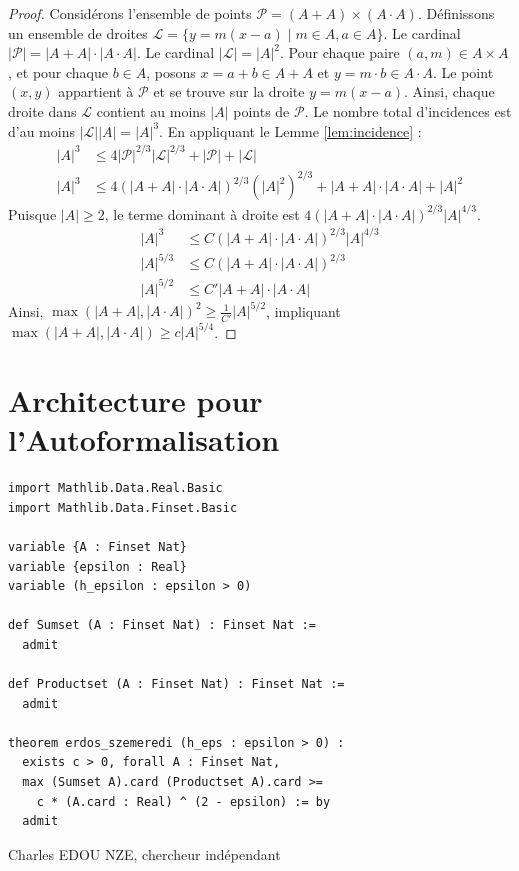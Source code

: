 \documentclass[12pt]{article}
\begin{document}
\begin{proof}
Consid\'erons l'ensemble de points $\mathcal{P} = (A + A) \times (A \cdot A)$.
D\'efinissons un ensemble de droites $\mathcal{L} = \{ y = m(x - a) \mid m \in A, a \in A \}$.
Le cardinal $|\mathcal{P}| = |A + A| \cdot |A \cdot A|$.
Le cardinal $|\mathcal{L}| = |A|^2$.
Pour chaque paire $(a, m) \in A \times A$, et pour chaque $b \in A$, posons $x = a + b \in A + A$ et $y = m \cdot b \in A \cdot A$.
Le point $(x, y)$ appartient \`a $\mathcal{P}$ et se trouve sur la droite $y = m(x - a)$.
Ainsi, chaque droite dans $\mathcal{L}$ contient au moins $|A|$ points de $\mathcal{P}$.
Le nombre total d'incidences est d'au moins $|\mathcal{L}| |A| = |A|^3$.
En appliquant le Lemme \ref{lem:incidence} :
\begin{align*}
|A|^3 &\leq 4 |\mathcal{P}|^{2/3} |\mathcal{L}|^{2/3} + |\mathcal{P}| + |\mathcal{L}| \\
|A|^3 &\leq 4 (|A + A| \cdot |A \cdot A|)^{2/3} (|A|^2)^{2/3} + |A + A| \cdot |A \cdot A| + |A|^2
\end{align*}
Puisque $|A| \geq 2$, le terme dominant \`a droite est $4 (|A + A| \cdot |A \cdot A|)^{2/3} |A|^{4/3}$.
\begin{align*}
|A|^3 &\leq C (|A + A| \cdot |A \cdot A|)^{2/3} |A|^{4/3} \\
|A|^{5/3} &\leq C (|A + A| \cdot |A \cdot A|)^{2/3} \\
|A|^{5/2} &\leq C' |A + A| \cdot |A \cdot A|
\end{align*}
Ainsi, $\max(|A + A|, |A \cdot A|)^2 \geq \frac{1}{C'} |A|^{5/2}$, impliquant $\max(|A + A|, |A \cdot A|) \geq c |A|^{5/4}$.
\end{proof}

\section{Architecture pour l'Autoformalisation}
\begin{lstlisting}
import Mathlib.Data.Real.Basic
import Mathlib.Data.Finset.Basic

variable {A : Finset Nat}
variable {epsilon : Real}
variable (h_epsilon : epsilon > 0)

def Sumset (A : Finset Nat) : Finset Nat :=
  admit

def Productset (A : Finset Nat) : Finset Nat :=
  admit

theorem erdos_szemeredi (h_eps : epsilon > 0) :
  exists c > 0, forall A : Finset Nat,
  max (Sumset A).card (Productset A).card >=
    c * (A.card : Real) ^ (2 - epsilon) := by
  admit
\end{lstlisting}

\vfill
Charles EDOU NZE, chercheur ind\'ependant
\end{document}

